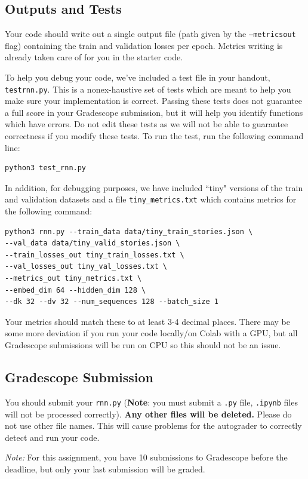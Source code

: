 \documentclass[11pt,addpoints,answers]{exam}
\begin{document}
\subsection{Outputs and Tests} 
Your code should write out a single output file (path given by the \texttt{--metrics\textunderscore out} flag) containing the train and validation losses per epoch. Metrics writing is already taken care of for you in the starter code.

To help you debug your code, we’ve included a test file in your handout, \texttt{test\textunderscore rnn.py}. This is a nonex-haustive set of tests which are meant to help you make sure your implementation is correct. Passing these tests does not guarantee a full score in your Gradescope submission, but it will help you identify functions which have errors. Do not edit these tests as we will not be able to guarantee correctness if you modify these tests. To run the test, run the following command line:
\begin{lstlisting}[language=Shell]
python3 test_rnn.py
\end{lstlisting}

In addition, for debugging purposes, we have included ``tiny" versions of the train and validation datasets and a file \texttt{tiny\_metrics.txt} which contains metrics for the following command:
\begin{lstlisting}
python3 rnn.py --train_data data/tiny_train_stories.json \
--val_data data/tiny_valid_stories.json \
--train_losses_out tiny_train_losses.txt \ 
--val_losses_out tiny_val_losses.txt \
--metrics_out tiny_metrics.txt \
--embed_dim 64 --hidden_dim 128 \
--dk 32 --dv 32 --num_sequences 128 --batch_size 1 
\end{lstlisting}

Your metrics should match these to at least 3-4 decimal places. There may be some more deviation if you run your code locally/on Colab with a GPU, but all Gradescope submissions will be run on CPU so this should not be an issue.

\subsection{Gradescope Submission}

You should submit your \texttt{rnn.py} (\textbf{Note}: you must submit a \texttt{.py} file, \texttt{.ipynb} files will not be processed correctly). \textbf{Any other files will be deleted.} Please do not use other file names. This will cause problems for the autograder to correctly detect and run your code.


\textit{Note:} For this assignment, you have 10 submissions to Gradescope before the deadline, but only your last submission will be graded.
\end{document}
